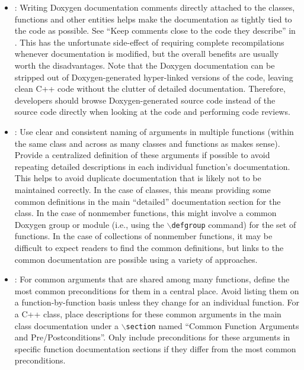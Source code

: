 \begin{itemize}


\item\DOXWriteInHeaders: Writing Doxygen documentation comments
  directly attached to the classes, functions and other entities helps
  make the documentation as tightly tied to the code as possible.  See
  ``Keep comments close to the code they describe'' in \cite[Section
  32.5]{CodeComplete2nd04}.  This has the unfortunate side-effect of
  requiring complete recompilations whenever documentation is
  modified, but the overall benefits are usually worth the
  disadvantages.  Note that the Doxygen documentation can be stripped
  out of Doxygen-generated hyper-linked versions of the code, leaving
  clean C++ code without the clutter of detailed documentation.
  Therefore, developers should browse Doxygen-generated source code
  instead of the source code directly when looking at the code and
  performing code reviews.


\item\DOXUseCentralizedDefintions: Use clear and consistent naming of
  arguments in multiple functions (within the same class and across as
  many classes and functions as makes sense).  Provide a centralized
  definition of these arguments if possible to avoid repeating
  detailed descriptions in each individual function's documentation.
  This helps to avoid duplicate documentation that is likely not to be
  maintained correctly.  In the case of classes, this means providing
  some common definitions in the main ``detailed'' documentation
  section for the class.  In the case of nonmember functions, this
  might involve a common Doxygen group or module (i.e., using the
  \texttt{$\backslash$defgroup} command) for the set of functions.
  In the case of collections of nonmember functions, it may be
  difficult to expect readers to find the common definitions, but
  links to the common documentation are possible using a variety of
  approaches.


\item\DOXUseCentralizedPrePostConditions: For common arguments that
  are shared among many functions, define the most common
  preconditions for them in a central place.  Avoid listing them on a
  function-by-function basis unless they change for an individual
  function.  For a C++ class, place descriptions for these common
  arguments in the main class documentation under a
  {}\texttt{$\backslash$section} named ``Common Function Arguments and
  Pre/Postconditions''.  Only include preconditions for these
  arguments in specific function documentation sections if they differ
  from the most common preconditions.



\end{itemize}

